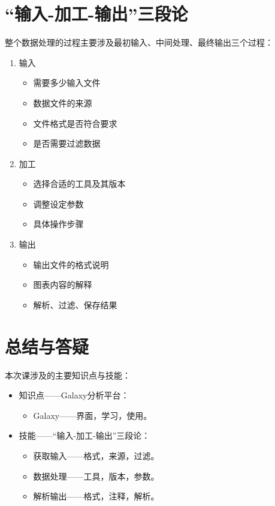 \documentclass[11pt,a4paper,twoside]{book}
\begin{document}
\section{“输入-加工-输出”三段论}
整个数据处理的过程主要涉及最初输入、中间处理、最终输出三个过程：
\begin{enumerate}
  \item 输入
    \begin{itemize}
      \item 需要多少输入文件
      \item 数据文件的来源
      \item 文件格式是否符合要求
      \item 是否需要过滤数据
    \end{itemize}
  \item 加工
    \begin{itemize}
      \item 选择合适的工具及其版本
      \item 调整设定参数
      \item 具体操作步骤
    \end{itemize}
  \item 输出
    \begin{itemize}
      \item 输出文件的格式说明
      \item 图表内容的解释
      \item 解析、过滤、保存结果
    \end{itemize}
\end{enumerate}

\section{总结与答疑}
本次课涉及的主要知识点与技能：
\begin{itemize}
  \item 知识点——Galaxy分析平台：
    \begin{itemize}
      \item Galaxy——界面，学习，使用。
    \end{itemize}
  \item 技能——“输入-加工-输出”三段论：
    \begin{itemize}
      \item 获取输入——格式，来源，过滤。
      \item 数据处理——工具，版本，参数。
      \item 解析输出——格式，注释，解析。
    \end{itemize}
\end{itemize}
\end{document}
